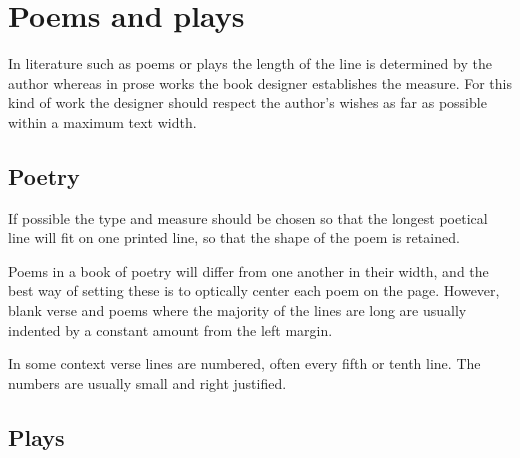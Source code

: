 \documentclass[10pt,a4paper,extrafontsizes]{memoir}
\begin{document}
\section{Poems and plays}

\begin{paracol}{2}
\switchEng
    In literature such as poems or plays 
the length of the line is determined
by the author whereas in prose works the book designer establishes the measure.
For this kind of work the designer should respect the author's wishes as 
far as possible within a maximum text width.
\end{paracol}

\subsection{Poetry}

\begin{paracol}{2}
\switchEng
    If possible the type and measure should be chosen so that the longest
poetical line will fit on one printed line, so that the shape of the poem
is retained.

    Poems in a book of poetry will differ from one another in their width, 
and the best way of setting these is to optically center each poem on the 
page. However, blank verse and poems where the majority of the lines are
long are usually indented by a constant amount from the left margin.

    In some context verse lines are numbered, often every fifth or tenth line.
The numbers are usually small and right justified.
\end{paracol}

\subsection{Plays}
\end{document}
